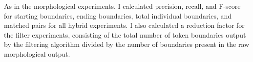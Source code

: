 As in the morphological experiments, I calculated precision, recall, and F-score for starting boundaries, ending boundaries, total individual boundaries, and matched pairs for all hybrid experiments. I also calculated a reduction factor for the filter experiments, consisting of the total number of token boundaries output by the filtering algorithm divided by the number of boundaries present in the raw morphological output.